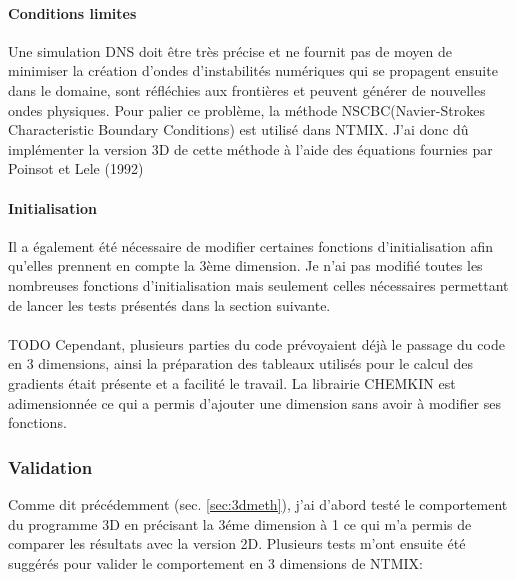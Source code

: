 \paragraph{Conditions limites}\label{sec:nsbc}
Une simulation DNS doit être très précise et ne fournit pas de moyen de minimiser la création d'ondes d'instabilités numériques qui se propagent ensuite dans le domaine, sont réfléchies aux frontières et peuvent générer de nouvelles ondes physiques\cite{baritaud1996direct}. Pour palier ce problème, la méthode NSCBC(Navier-Strokes Characteristic Boundary Conditions) est utilisé dans NTMIX. J'ai donc dû implémenter la version 3D de cette méthode à l'aide des équations fournies par Poinsot et Lele (1992)\cite{POINSOT1992104}

\paragraph{Initialisation}Il a également été nécessaire de modifier certaines fonctions d'initialisation afin qu'elles prennent en compte la 3ème dimension. Je n'ai pas modifié toutes les nombreuses fonctions d'initialisation mais seulement  celles nécessaires permettant de lancer les tests présentés dans la section suivante.


\paragraph{}TODO Cependant, plusieurs parties du code prévoyaient déjà le passage du code en 3 dimensions, ainsi la préparation des tableaux utilisés pour le calcul des gradients était présente et a facilité le travail. La librairie CHEMKIN est adimensionnée ce qui a permis d'ajouter une dimension sans avoir à modifier ses fonctions. 


\subsubsection{Validation}\label{sec:3D-validation}
Comme dit précédemment (sec. \ref{sec:3dmeth}), j'ai d'abord testé le comportement du programme 3D en précisant la 3éme dimension à 1 ce qui m'a permis de comparer les résultats avec la version 2D. Plusieurs tests m'ont ensuite été suggérés pour valider le comportement en 3 dimensions de NTMIX:

